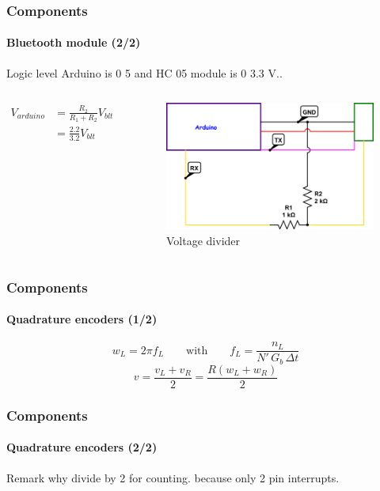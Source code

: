 \documentclass{beamer}
\begin{document}
\begin{frame}
\frametitle{Components}
\framesubtitle{Bluetooth module (2/2)}
Logic level Arduino is 0 5 and HC 05 module is 0 3.3 V..
\begin{columns}[c]

\begin{align*} 
V_{arduino} &=  \frac{R_2}{R_1+R_2}V_{blt} \\[0.4cm]
 &=  \frac{2.2}{3.2}V_{blt}
\end{align*}

\begin{figure}[hbtp]
\centering
\includegraphics[scale=0.5]{figures/voltage-divider.png}
\caption{Voltage divider}
\end{figure}

\end{columns}
\end{frame}


\begin{frame}
\frametitle{Components}
\framesubtitle{Quadrature encoders (1/2)}
$$ 
w_L = 2\pi f_L
\qquad\text{with}\qquad	
f_L = \frac{n_L}{N' \, G_b \, \Delta{t} }
$$
$$ 
v = \frac{v_L + v_R}{2} = \frac{R(w_L + w_R)}{2}
$$
\end{frame}


\begin{frame}
\frametitle{Components}
\framesubtitle{Quadrature encoders (2/2)}
Remark why divide by 2 for counting. because only 2 pin interrupts.
\end{frame}
\end{document}
